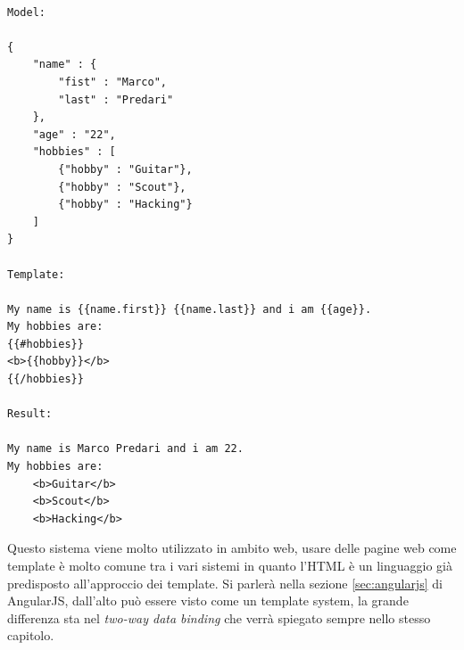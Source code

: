 \begin{lstlisting}[caption = "Un esempio di modello in json e la sua corrispondeza con il template system mustache e il risultato che si ottiene", label = "lst:jsonmustache"]

Model:

{
	"name" : {
		"fist" : "Marco",
	 	"last" : "Predari"
	},
	"age" : "22",
	"hobbies" : [
		{"hobby" : "Guitar"},
		{"hobby" : "Scout"},
		{"hobby" : "Hacking"}
	]
}

Template:

My name is {{name.first}} {{name.last}} and i am {{age}}.
My hobbies are:
{{#hobbies}}
<b>{{hobby}}</b>
{{/hobbies}}

Result:

My name is Marco Predari and i am 22.
My hobbies are:
	<b>Guitar</b>
	<b>Scout</b>
	<b>Hacking</b>
\end{lstlisting}

Questo sistema viene molto utilizzato in ambito web, usare delle pagine web come template è molto comune tra i vari sistemi in quanto l'HTML è un linguaggio già predisposto all'approccio dei template. Si parlerà nella sezione \ref{sec:angularjs} di AngularJS, dall'alto può essere visto come un template system, la grande differenza sta nel \emph{two-way data binding} che verrà spiegato sempre nello stesso capitolo.
 




